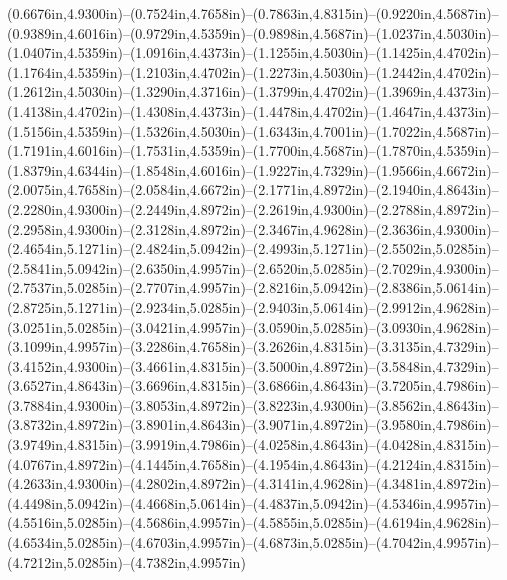 (0.6676in,4.9300in)--(0.7524in,4.7658in)--(0.7863in,4.8315in)--(0.9220in,4.5687in)--(0.9389in,4.6016in)--(0.9729in,4.5359in)--(0.9898in,4.5687in)--(1.0237in,4.5030in)--(1.0407in,4.5359in)--(1.0916in,4.4373in)--(1.1255in,4.5030in)--(1.1425in,4.4702in)--(1.1764in,4.5359in)--(1.2103in,4.4702in)--(1.2273in,4.5030in)--(1.2442in,4.4702in)--(1.2612in,4.5030in)--(1.3290in,4.3716in)--(1.3799in,4.4702in)--(1.3969in,4.4373in)--(1.4138in,4.4702in)--(1.4308in,4.4373in)--(1.4478in,4.4702in)--(1.4647in,4.4373in)--(1.5156in,4.5359in)--(1.5326in,4.5030in)--(1.6343in,4.7001in)--(1.7022in,4.5687in)--(1.7191in,4.6016in)--(1.7531in,4.5359in)--(1.7700in,4.5687in)--(1.7870in,4.5359in)--(1.8379in,4.6344in)--(1.8548in,4.6016in)--(1.9227in,4.7329in)--(1.9566in,4.6672in)--(2.0075in,4.7658in)--(2.0584in,4.6672in)--(2.1771in,4.8972in)--(2.1940in,4.8643in)--(2.2280in,4.9300in)--(2.2449in,4.8972in)--(2.2619in,4.9300in)--(2.2788in,4.8972in)--(2.2958in,4.9300in)--(2.3128in,4.8972in)--(2.3467in,4.9628in)--(2.3636in,4.9300in)--(2.4654in,5.1271in)--(2.4824in,5.0942in)--(2.4993in,5.1271in)--(2.5502in,5.0285in)--(2.5841in,5.0942in)--(2.6350in,4.9957in)--(2.6520in,5.0285in)--(2.7029in,4.9300in)--(2.7537in,5.0285in)--(2.7707in,4.9957in)--(2.8216in,5.0942in)--(2.8386in,5.0614in)--(2.8725in,5.1271in)--(2.9234in,5.0285in)--(2.9403in,5.0614in)--(2.9912in,4.9628in)--(3.0251in,5.0285in)--(3.0421in,4.9957in)--(3.0590in,5.0285in)--(3.0930in,4.9628in)--(3.1099in,4.9957in)--(3.2286in,4.7658in)--(3.2626in,4.8315in)--(3.3135in,4.7329in)--(3.4152in,4.9300in)--(3.4661in,4.8315in)--(3.5000in,4.8972in)--(3.5848in,4.7329in)--(3.6527in,4.8643in)--(3.6696in,4.8315in)--(3.6866in,4.8643in)--(3.7205in,4.7986in)--(3.7884in,4.9300in)--(3.8053in,4.8972in)--(3.8223in,4.9300in)--(3.8562in,4.8643in)--(3.8732in,4.8972in)--(3.8901in,4.8643in)--(3.9071in,4.8972in)--(3.9580in,4.7986in)--(3.9749in,4.8315in)--(3.9919in,4.7986in)--(4.0258in,4.8643in)--(4.0428in,4.8315in)--(4.0767in,4.8972in)--(4.1445in,4.7658in)--(4.1954in,4.8643in)--(4.2124in,4.8315in)--(4.2633in,4.9300in)--(4.2802in,4.8972in)--(4.3141in,4.9628in)--(4.3481in,4.8972in)--(4.4498in,5.0942in)--(4.4668in,5.0614in)--(4.4837in,5.0942in)--(4.5346in,4.9957in)--(4.5516in,5.0285in)--(4.5686in,4.9957in)--(4.5855in,5.0285in)--(4.6194in,4.9628in)--(4.6534in,5.0285in)--(4.6703in,4.9957in)--(4.6873in,5.0285in)--(4.7042in,4.9957in)--(4.7212in,5.0285in)--(4.7382in,4.9957in)
